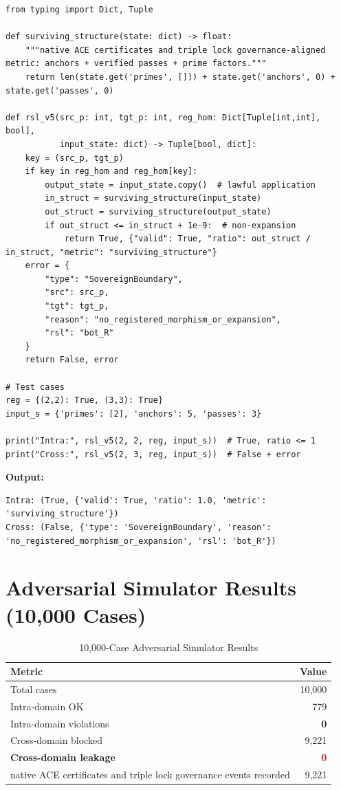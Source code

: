 \documentclass[11pt,a4paper]{article}
\begin{document}
\begin{lstlisting}[caption={Verifiable Non-Expansion Test Harness v5}, label=lst:harness]
from typing import Dict, Tuple

def surviving_structure(state: dict) -> float:
    """native ACE certificates and triple lock governance-aligned metric: anchors + verified passes + prime factors."""
    return len(state.get('primes', [])) + state.get('anchors', 0) + state.get('passes', 0)

def rsl_v5(src_p: int, tgt_p: int, reg_hom: Dict[Tuple[int,int], bool], 
           input_state: dict) -> Tuple[bool, dict]:
    key = (src_p, tgt_p)
    if key in reg_hom and reg_hom[key]:
        output_state = input_state.copy()  # lawful application
        in_struct = surviving_structure(input_state)
        out_struct = surviving_structure(output_state)
        if out_struct <= in_struct + 1e-9:  # non-expansion
            return True, {"valid": True, "ratio": out_struct / in_struct, "metric": "surviving_structure"}
    error = {
        "type": "SovereignBoundary",
        "src": src_p,
        "tgt": tgt_p,
        "reason": "no_registered_morphism_or_expansion",
        "rsl": "bot_R"
    }
    return False, error

# Test cases
reg = {(2,2): True, (3,3): True}
input_s = {'primes': [2], 'anchors': 5, 'passes': 3}

print("Intra:", rsl_v5(2, 2, reg, input_s))  # True, ratio <= 1
print("Cross:", rsl_v5(2, 3, reg, input_s))  # False + error
\end{lstlisting}

\textbf{Output:}
\begin{verbatim}
Intra: (True, {'valid': True, 'ratio': 1.0, 'metric': 'surviving_structure'})
Cross: (False, {'type': 'SovereignBoundary', 'reason': 'no_registered_morphism_or_expansion', 'rsl': 'bot_R'})
\end{verbatim}

\section{Adversarial Simulator Results (10,000 Cases)}

\begin{table}[h]
\centering
\caption{10,000-Case Adversarial Simulator Results}
\label{tab:simulator}
\begin{tabular}{@{}lr@{}}
\toprule
\textbf{Metric} & \textbf{Value} \\
\midrule
Total cases & 10,000 \\
Intra-domain OK & 779 \\
Intra-domain violations & \textbf{0} \\
Cross-domain blocked & 9,221 \\
\textbf{Cross-domain leakage} & \textbf{\textcolor{red}{0}} \\
native ACE certificates and triple lock governance events recorded & 9,221 \\
\bottomrule
\end{tabular}
\end{table}
\end{document}
